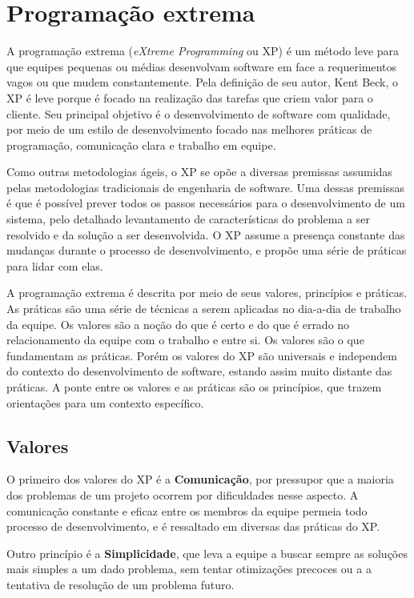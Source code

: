 \documentclass[a4paper,12pt,font=plain,header=plain]{abnt}
\begin{document}
  \section{Programação extrema}
    A programação extrema (\textit{eXtreme Programming} ou XP) é um método leve para que equipes pequenas ou médias desenvolvam software em face a requerimentos vagos ou que mudem constantemente\cite{beck04}. Pela definição de seu autor, Kent Beck, o XP é leve porque é focado na realização das tarefas que criem valor para o cliente. Seu principal objetivo é o desenvolvimento de software com qualidade, por meio de um estilo de desenvolvimento focado nas melhores práticas de programação, comunicação clara e trabalho em equipe.

    Como outras metodologias ágeis, o XP se opõe a diversas premissas assumidas pelas metodologias tradicionais de engenharia de software. Uma dessas premissas é que é possível prever todos os passos necessários para o desenvolvimento de um sistema, pelo detalhado levantamento de características do problema a ser resolvido e da solução a ser desenvolvida. O XP assume a presença constante das mudanças durante o processo de desenvolvimento, e propõe uma série de práticas para lidar com elas.

    A programação extrema é descrita por meio de seus valores, princípios e práticas. As práticas são uma série de técnicas a serem aplicadas no dia-a-dia de trabalho da equipe. Os valores são a noção do que é certo e do que é errado no relacionamento da equipe com o trabalho e entre si. Os valores são o que fundamentam as práticas. Porém os valores do XP são universais e independem do contexto do desenvolvimento de software, estando assim muito distante das práticas. A ponte entre os valores e as práticas são os princípios, que trazem orientações para um contexto específico.

    \subsection{Valores}

      O primeiro dos valores do XP é a \textbf{Comunicação}, por pressupor que a maioria dos problemas de um projeto ocorrem por dificuldades nesse aspecto. A comunicação constante e eficaz entre os membros da equipe permeia todo processo de desenvolvimento, e é ressaltado em diversas das práticas do XP.

      Outro princípio é a \textbf{Simplicidade}, que leva a equipe a buscar sempre as soluções mais simples a um dado problema, sem tentar otimizações precoces ou a a tentativa de resolução de um problema futuro.
\end{document}
